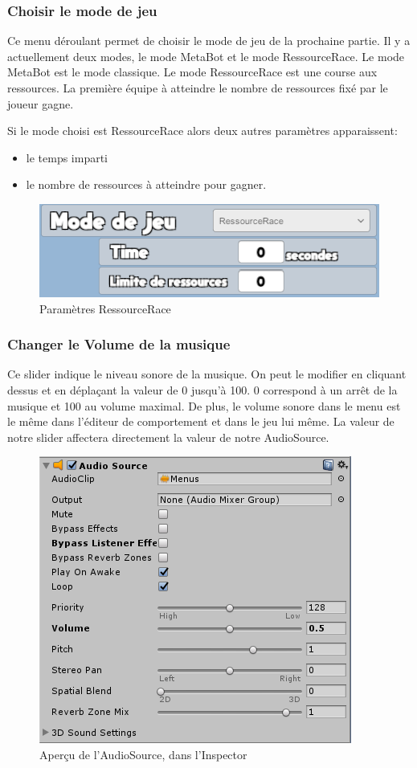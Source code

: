 \documentclass{report}
\begin{document}
\subsubsection{Choisir le mode de jeu}
Ce menu déroulant permet de choisir le mode de jeu de la prochaine partie. Il y a actuellement deux modes, le mode MetaBot et le mode RessourceRace. Le mode MetaBot est le mode classique. Le mode RessourceRace est une course aux ressources. La première équipe à atteindre le nombre de ressources fixé par le joueur gagne.

Si le mode choisi est RessourceRace alors deux autres paramètres apparaissent:
\begin{itemize}
\item le temps imparti
\item le nombre de ressources à atteindre pour gagner.
\end{itemize}

\begin{figure}[!h]
	\centering
		\includegraphics[scale=0.80]{ManuelJeu/ModeJeuRessourceRace}
	\caption{Paramètres RessourceRace}
\end{figure}

\subsubsection{Changer le Volume de la musique}
Ce slider indique le niveau sonore de la musique. On peut le modifier en cliquant dessus et en déplaçant la valeur de 0 jusqu’à 100. 0 correspond à un arrêt de la musique et 100 au volume maximal. \newline
De plus, le volume sonore dans le menu est le même dans l'éditeur de comportement et dans le jeu lui même.
La valeur de notre slider affectera directement la valeur de notre AudioSource.
\smallbreak
\begin{figure}[h]
	\centering
		\includegraphics[scale=1]{AudioSource}
	\caption{Aperçu de l'AudioSource, dans l'Inspector}
\end{figure}
\end{document}
